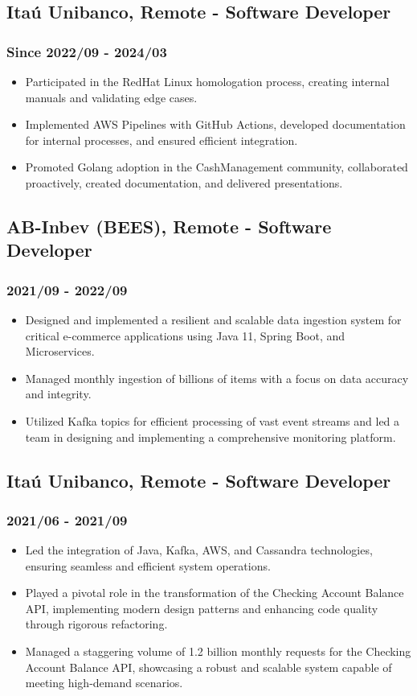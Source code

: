 \documentclass[a4paper,10pt]{article}
\begin{document}
\subsection*{Itaú Unibanco, Remote - Software Developer}
\subsubsection*{Since 2022/09 - 2024/03}
\begin{itemize}
    \item Participated in the RedHat Linux homologation process, creating internal manuals and validating edge cases.
    \item Implemented AWS Pipelines with GitHub Actions, developed documentation for internal processes, and ensured efficient integration.
    \item Promoted Golang adoption in the CashManagement community, collaborated proactively, created documentation, and delivered presentations.
\end{itemize}

\subsection*{AB-Inbev (BEES), Remote - Software Developer}
\subsubsection*{2021/09 - 2022/09}
\begin{itemize}
    \item Designed and implemented a resilient and scalable data ingestion system for critical e-commerce applications using Java 11, Spring Boot, and Microservices.
    \item Managed monthly ingestion of billions of items with a focus on data accuracy and integrity.
    \item Utilized Kafka topics for efficient processing of vast event streams and led a team in designing and implementing a comprehensive monitoring platform.
\end{itemize}

\subsection*{Itaú Unibanco, Remote - Software Developer}
\subsubsection*{2021/06 - 2021/09}
\begin{itemize}
    \item Led the integration of Java, Kafka, AWS, and Cassandra technologies, ensuring seamless and efficient system operations.
    \item Played a pivotal role in the transformation of the Checking Account Balance API, implementing modern design patterns and enhancing code quality through rigorous refactoring.
    \item Managed a staggering volume of 1.2 billion monthly requests for the Checking Account Balance API, showcasing a robust and scalable system capable of meeting high-demand scenarios.
\end{itemize}
\end{document}

